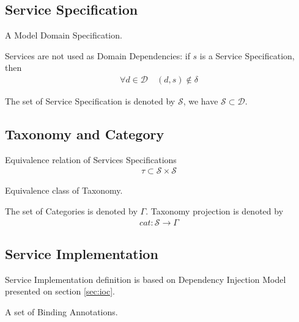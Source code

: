 \subsection{Service Specification}

\begin{defi}
  A Model Domain Specification.
\end{defi}

\begin{zalozenie}
 \item Services are not used as Domain Dependencies: if $s$ is a Service Specification, then
\begin{eqnarray}
 \forall d \in \mathcal{D} \quad  (d,s) \notin \delta
\end{eqnarray}
\end{zalozenie}

The set of Service Specification is denoted by $\mathcal{S}$, we have $\mathcal{S} \subset \mathcal{D}$.

\subsection{Taxonomy and Category}

\begin{defi}[Taxonomy]
  Equivalence relation of Services Specifications
\begin{eqnarray}
 \tau \subset \mathcal{S}  \times \mathcal{S} 
\end{eqnarray}
\end{defi}

\begin{defi}[Category]
  Equivalence class of Taxonomy.
\end{defi}

The set of Categories is denoted by $\Gamma$. Taxonomy projection is denoted by
\begin{eqnarray}
cat: \mathcal{S} \rightarrow \Gamma
\end{eqnarray}

\subsection{Service Implementation}

Service Implementation definition is based on Dependency Injection Model presented on section \ref{sec:ioc}.

\begin{defi}
  A set of Binding Annotations.
\end{defi}

